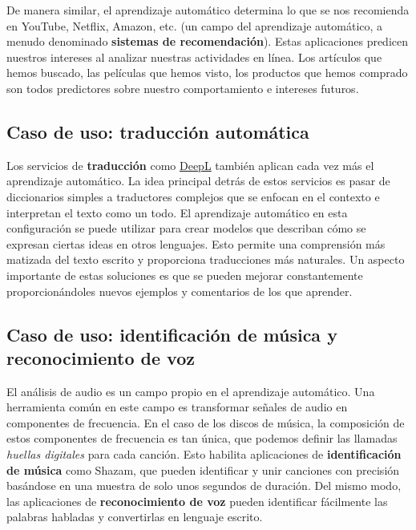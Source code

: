 \documentclass[
]{book}
\begin{document}
De manera similar, el aprendizaje automático determina lo que se nos recomienda en YouTube, Netflix, Amazon, etc. (un campo del aprendizaje automático, a menudo denominado \textbf{sistemas de recomendación}). Estas aplicaciones predicen nuestros intereses al analizar nuestras actividades en línea. Los artículos que hemos buscado, las películas que hemos visto, los productos que hemos comprado son todos predictores sobre nuestro comportamiento e intereses futuros.

\hypertarget{caso-de-uso-traducciuxf3n-automuxe1tica}{%
\subsection{Caso de uso: traducción automática}\label{caso-de-uso-traducciuxf3n-automuxe1tica}}

Los servicios de \textbf{traducción} como \href{https://www.deepl.com/en/translator}{DeepL} también aplican cada vez más el aprendizaje automático. La idea principal detrás de estos servicios es pasar de diccionarios simples a traductores complejos que se enfocan en el contexto e interpretan el texto como un todo. El aprendizaje automático en esta configuración se puede utilizar para crear modelos que describan cómo se expresan ciertas ideas en otros lenguajes. Esto permite una comprensión más matizada del texto escrito y proporciona traducciones más naturales. Un aspecto importante de estas soluciones es que se pueden mejorar constantemente proporcionándoles nuevos ejemplos y comentarios de los que aprender.

\hypertarget{caso-de-uso-identificaciuxf3n-de-muxfasica-y-reconocimiento-de-voz}{%
\subsection{Caso de uso: identificación de música y reconocimiento de voz}\label{caso-de-uso-identificaciuxf3n-de-muxfasica-y-reconocimiento-de-voz}}

El análisis de audio es un campo propio en el aprendizaje automático. Una herramienta común en este campo es transformar señales de audio en componentes de frecuencia. En el caso de los discos de música, la composición de estos componentes de frecuencia es tan única, que podemos definir las llamadas \emph{huellas digitales} para cada canción. Esto habilita aplicaciones de \textbf{identificación de música} como Shazam, que pueden identificar y unir canciones con precisión basándose en una muestra de solo unos segundos de duración. Del mismo modo, las aplicaciones de \textbf{reconocimiento de voz} pueden identificar fácilmente las palabras habladas y convertirlas en lenguaje escrito.
\end{document}
